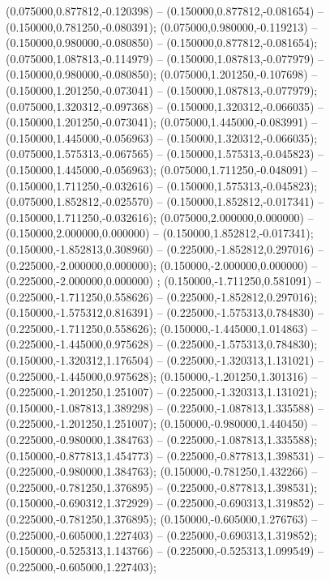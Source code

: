  (0.075000,0.877812,-0.120398) -- (0.150000,0.877812,-0.081654) -- (0.150000,0.781250,-0.080391);
 (0.075000,0.980000,-0.119213) -- (0.150000,0.980000,-0.080850) -- (0.150000,0.877812,-0.081654);
 (0.075000,1.087813,-0.114979) -- (0.150000,1.087813,-0.077979) -- (0.150000,0.980000,-0.080850);
 (0.075000,1.201250,-0.107698) -- (0.150000,1.201250,-0.073041) -- (0.150000,1.087813,-0.077979);
 (0.075000,1.320312,-0.097368) -- (0.150000,1.320312,-0.066035) -- (0.150000,1.201250,-0.073041);
 (0.075000,1.445000,-0.083991) -- (0.150000,1.445000,-0.056963) -- (0.150000,1.320312,-0.066035);
 (0.075000,1.575313,-0.067565) -- (0.150000,1.575313,-0.045823) -- (0.150000,1.445000,-0.056963);
 (0.075000,1.711250,-0.048091) -- (0.150000,1.711250,-0.032616) -- (0.150000,1.575313,-0.045823);
 (0.075000,1.852812,-0.025570) -- (0.150000,1.852812,-0.017341) -- (0.150000,1.711250,-0.032616);
 (0.075000,2.000000,0.000000) -- (0.150000,2.000000,0.000000) -- (0.150000,1.852812,-0.017341);
 (0.150000,-1.852813,0.308960) -- (0.225000,-1.852812,0.297016) -- (0.225000,-2.000000,0.000000);
 (0.150000,-2.000000,0.000000) -- (0.225000,-2.000000,0.000000) ;
 (0.150000,-1.711250,0.581091) -- (0.225000,-1.711250,0.558626) -- (0.225000,-1.852812,0.297016);
 (0.150000,-1.575312,0.816391) -- (0.225000,-1.575313,0.784830) -- (0.225000,-1.711250,0.558626);
 (0.150000,-1.445000,1.014863) -- (0.225000,-1.445000,0.975628) -- (0.225000,-1.575313,0.784830);
 (0.150000,-1.320312,1.176504) -- (0.225000,-1.320313,1.131021) -- (0.225000,-1.445000,0.975628);
 (0.150000,-1.201250,1.301316) -- (0.225000,-1.201250,1.251007) -- (0.225000,-1.320313,1.131021);
 (0.150000,-1.087813,1.389298) -- (0.225000,-1.087813,1.335588) -- (0.225000,-1.201250,1.251007);
 (0.150000,-0.980000,1.440450) -- (0.225000,-0.980000,1.384763) -- (0.225000,-1.087813,1.335588);
 (0.150000,-0.877813,1.454773) -- (0.225000,-0.877813,1.398531) -- (0.225000,-0.980000,1.384763);
 (0.150000,-0.781250,1.432266) -- (0.225000,-0.781250,1.376895) -- (0.225000,-0.877813,1.398531);
 (0.150000,-0.690312,1.372929) -- (0.225000,-0.690313,1.319852) -- (0.225000,-0.781250,1.376895);
 (0.150000,-0.605000,1.276763) -- (0.225000,-0.605000,1.227403) -- (0.225000,-0.690313,1.319852);
 (0.150000,-0.525313,1.143766) -- (0.225000,-0.525313,1.099549) -- (0.225000,-0.605000,1.227403);
